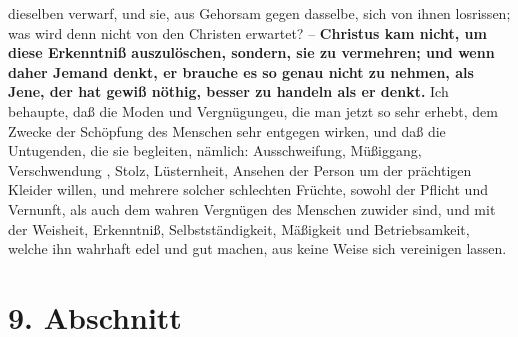dieselben verwarf, und sie, aus Gehorsam gegen dasselbe, sich von ihnen
losrissen; was wird denn nicht von den Christen erwartet? -- \textbf{Christus kam nicht,
um diese Erkenntniß auszulöschen, sondern, sie zu vermehren; und wenn daher
Jemand denkt, er brauche es so genau nicht zu nehmen, als Jene, der hat gewiß
nöthig, besser zu handeln als er denkt.} Ich behaupte, daß die Moden und
Vergnügungeu, die man jetzt so sehr erhebt, dem Zwecke der Schöpfung des
Menschen sehr entgegen wirken, und daß die Untugenden, die sie begleiten,
nämlich: Ausschweifung, Müßiggang, Verschwendung , Stolz, Lüsternheit, Ansehen
der Person um der prächtigen Kleider willen, und mehrere solcher schlechten
Früchte, sowohl der Pflicht und Vernunft, als auch dem wahren Vergnügen des
Menschen zuwider sind, und mit der Weisheit, Erkenntniß, Selbstständigkeit,
Mäßigkeit und Betriebsamkeit, welche ihn wahrhaft edel und gut machen, aus keine
Weise sich vereinigen lassen.

\section{9. Abschnitt} \label{kap14_ab9}

